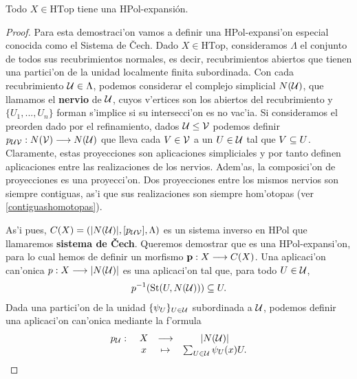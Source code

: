 \begin{theorem}
  Todo $ X\in \text{HTop} $ tiene una HPol-expansión. 
\end{theorem}
\begin{proof}
    Para esta demostraci'on vamos a definir una HPol-expansi'on especial conocida como el Sistema de \v Cech. Dado $ X\in \text{HTop}$, consideramos $ \Lambda  $ el conjunto de todos sus recubrimientos normales, es decir, recubrimientos abiertos que tienen una partici'on de la unidad localmente finita subordinada. Con cada recubrimiento $ \mathcal{U} \in \Lambda  $, podemos considerar el complejo simplicial $ N(\mathcal{U}) $, que llamamos el \textbf{nervio} de $ \mathcal{U} $, cuyos v'ertices son los abiertos del recubrimiento y $ \{U_1,...,U_n \} $ forman s'implice si su intersecci'on es no vac'ia. Si consideramos el preorden dado por el refinamiento, dados $ \mathcal{U} \leq \mathcal{V}  $ podemos definir $ p_{\mathcal{U}\mathcal{V} }:N(\mathcal{V})\longrightarrow N(\mathcal{U} ) $ que lleva cada $ V\in \mathcal{V}  $ a un $ U\in \mathcal{U}  $ tal que $ V\subseteq U  $. Claramente, estas proyecciones son aplicaciones simpliciales y por tanto definen aplicaciones entre las realizaciones de los nervios. Adem'as, la composici'on de proyecciones es una proyecci'on. Dos proyecciones entre los mismos nervios son siempre contiguas, as'i que sus realizaciones son siempre hom'otopas (ver \ref{contiguashomotopas}).

    As'i pues, $C(X) =  (\abs{N(\mathcal{U} )},[p_{\mathcal{U}\mathcal{V}}],\Lambda ) $ es un sistema inverso en HPol que llamaremos \textbf{sistema de \v Cech}. Queremos demostrar que es una HPol-expansi'on, para lo cual hemos de definir un morfismo $ \mathbf{p}:X\longrightarrow C(X)  $. Una aplicaci'on can'onica $ p:X\longrightarrow \abs{N(\mathcal{U} )} $ es una aplicaci'on tal que, para todo $ U\in \mathcal{U}  $, 
    \begin{gather}\label{aplicacioncanonica}
      p^{-1} (\operatorname{St}(U,N(\mathcal{U} )))\subseteq U  .
    \end{gather}
    Dada una partici'on de la unidad $ \{\psi_U\}_{U\in \mathcal{U} } $ subordinada a $ \mathcal{U}  $, podemos definir una aplicaci'on can'onica mediante la f'ormula 
    \begin{gather*}
      \begin{matrix}
      p_{\mathcal{U}} : \ &X  &\longrightarrow &\abs{N(\mathcal{U} )} \\
      &x  &\mapsto &\sum_{U\in \mathcal{U}}\psi_U (x) U.
      \end{matrix}
    \end{gather*}
    

\end{proof}
